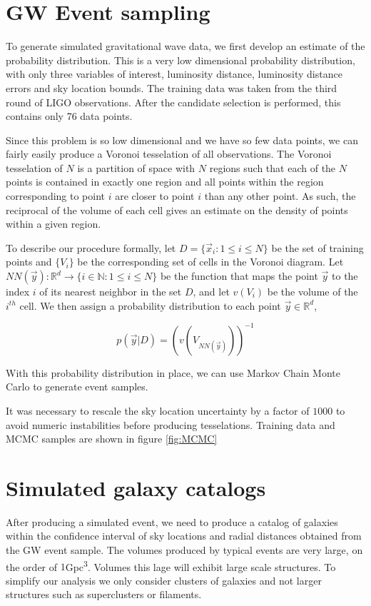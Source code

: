 \section{GW Event sampling} \label{sec:MCMC}
To generate simulated gravitational wave data, we first develop an estimate of the probability distribution. This is a very low dimensional probability distribution, with only three variables of interest, luminosity distance, luminosity distance errors and sky location bounds. The training data was taken from the third round of LIGO observations\cite{GWTC_2,GWTC_3}. After the candidate selection is performed, this contains only 76 data points.

Since this problem is so low dimensional and we have so few data points, we can fairly easily produce a Voronoi tesselation of all observations. The Voronoi tesselation of $N$ is a partition of space with $N$ regions such that each of the $N$ points is contained in exactly one region and all points within the region corresponding to point $i$ are closer to point $i$ than any other point. As such, the reciprocal of the volume of each cell gives an estimate on the density of points within a given region.

To describe our procedure formally, let $D=\{\vec{x}_i : 1\leq i\leq N\}$ be the set of training points and $\{V_i\}$ be the corresponding set of cells in the Voronoi diagram. Let $NN(\vec{y}):\mathbb{R}^d\to \{i\in\mathbb{N} : 1\leq i\leq N\}$ be the function that maps the point $\vec{y}$ to the index $i$ of its nearest neighbor in the set $D$, and let $v(V_i)$ be the volume of the $i^{th}$ cell. We then assign a probability distribution to each point $\vec{y}\in\mathbb{R}^d$, 

\begin{equation}
p(\vec{y} | D) = \left( v( V_{NN(\vec{y})} ) \right)^{-1}
\end{equation}

With this probability distribution in place, we can use Markov Chain Monte Carlo to generate event samples.

It was necessary to rescale the sky location uncertainty by a factor of $1000$ to avoid numeric instabilities before producing tesselations. Training data and MCMC samples are shown in figure \ref{fig:MCMC}

\section{Simulated galaxy catalogs}
After producing a simulated event, we need to produce a catalog of galaxies within the confidence interval of sky locations and radial distances obtained from the GW event sample. The volumes produced by typical events are very large, on the order of $1$\si{Gpc^3}. Volumes this lage will exhibit large scale structures. To simplify our analysis we only consider clusters of galaxies and not larger structures such as superclusters or filaments.

